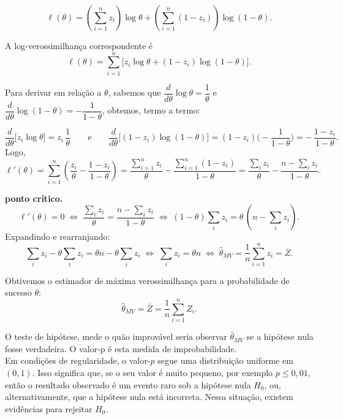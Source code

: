 
\[
\ell(\theta)
= \left(\sum_{i=1}^{n} z_i\right)\log \theta
+ \left(\sum_{i=1}^{n}(1-z_i)\right)\log(1-\theta).
\]

A log-verossimilhança correspondente é
\[
\boxed{\ell(\theta) 
= \sum_{i=1}^n \big[z_i \log\theta + (1-z_i)\log(1-\theta)\big].}
\]

Para derivar em relação a \(\theta\), sabemos que 
\(\dfrac{d}{d\theta}\log\theta=\dfrac1\theta\) e 
\(\dfrac{d}{d\theta}\log(1-\theta)= -\dfrac1{1-\theta}\), obtemos,
termo a termo:

\[
\frac{d}{d\theta}\Big[z_i\log\theta\Big]
= z_i\,\frac1\theta
\qquad\text{e}\qquad
\frac{d}{d\theta}\Big[(1-z_i)\log(1-\theta)\Big]
= (1-z_i)\Big(-\frac1{1-\theta}\Big)
= -\,\frac{1-z_i}{1-\theta}.
\]
Logo,
\[
\ell'(\theta)
=\sum_{i=1}^n\left(\frac{z_i}{\theta}-\frac{1-z_i}{1-\theta}\right)
= \frac{\sum_{i=1}^n z_i}{\theta} - \frac{\sum_{i=1}^n(1-z_i)}{1-\theta}
= \frac{\sum_i z_i}{\theta} - \frac{n-\sum_i z_i}{1-\theta}.
\]

 \textbf{ponto crítico.}
\[
\ell'(\theta)=0
\;\Longleftrightarrow\;
\frac{\sum_i z_i}{\theta}
= \frac{n-\sum_i z_i}{1-\theta}
\;\Longleftrightarrow\;
(1-\theta)\sum_i z_i=\theta\,(n-\sum_i z_i).
\]
Expandindo e rearranjando:
\[
\sum_i z_i - \theta\sum_i z_i = \theta n - \theta\sum_i z_i
\;\Longleftrightarrow\;
\sum_i z_i = \theta n
\;\Longleftrightarrow\;
\widehat\theta_{MV}=\frac1n\sum_{i=1}^n z_i=\overline Z.
\]


Obtivemos o estimador de máxima verossimilhança para a probabilidade de sucesso \(\theta\):
\[
\boxed{\hat{\theta}_{MV} = \bar{Z} = \frac{1}{n}\sum_{i=1}^n Z_i.}
\]

O teste de hipótese, mede o quão improvável seria observar $\hat{\theta}_{MV}$ se a hipótese nula fosse verdadeira. O valor-p é esta medida de improbabilidade.
\\[1em]
Em condições de regularidade, o valor-$p$ segue uma distribuição uniforme em $(0,1)$.
Isso significa que, se o seu valor é muito pequeno, por exemplo $p \leq 0{,}01$,
então o resultado observado é um evento raro sob a hipótese nula $H_0$,
ou, alternativamente, que a hipótese nula está incorreta.
Nessa situação, existem evidências para rejeitar $H_0$.
